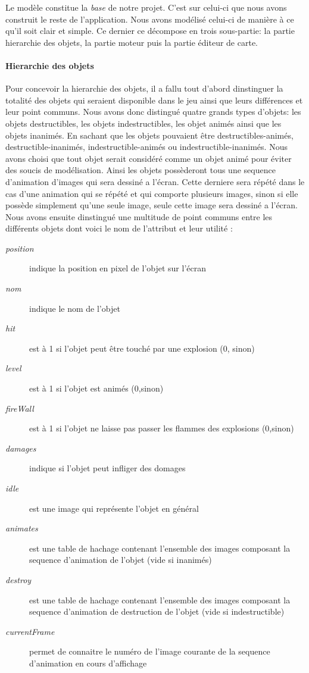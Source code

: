 	Le modèle constitue la \textit{base} de notre projet. C'est sur celui-ci que nous avons construit le reste de l'application. Nous avons modélisé celui-ci de manière à ce qu'il soit clair et simple. Ce dernier ce décompose en trois sous-partie: la partie hierarchie des objets, la partie moteur puis la partie éditeur de carte.\\
	
	\paragraph{Hierarchie des objets \\}
	
	Pour concevoir la hierarchie des objets, il a fallu tout d'abord dinstinguer la totalité des objets qui seraient disponible dans le jeu ainsi que leurs différences et leur point communs.  Nous avons donc distingué quatre grands types d'objets: les objets destructibles, les objets indestructibles, les objet animés ainsi que les objets inanimés. En sachant que les objets pouvaient être destructibles-animés, destructible-inanimés, indestructible-animés ou indestructible-inanimés. Nous avons choisi que tout objet serait considéré comme un objet animé pour éviter des soucis de modélisation. Ainsi les objets possèderont tous une sequence d'animation d'images qui sera dessiné a l'écran. Cette derniere sera répété dans le cas d'une animation qui se répété et qui comporte plusieurs images, sinon si elle possède simplement qu'une seule image, seule cette image sera dessiné a l'écran. Nous avons ensuite dinstingué une multitude de point communs entre les différents objets dont voici le nom de l'attribut et leur utilité : 
	
	\begin{description}
		\item [\textit{position}]{indique la position en pixel de l'objet sur l'écran}
		\item [\textit{nom}]{indique le nom de l'objet}
		\item [\textit{hit}]{est à 1 si l'objet peut être touché par une explosion (0, sinon)}
		\item [\textit{level}]{est à 1 si l'objet est animés (0,sinon)}
		\item [\textit{fireWall}]{est à 1 si l'objet ne laisse pas passer les flammes des explosions (0,sinon)}
		\item [\textit{damages}]{indique si l'objet peut infliger des domages}
		\item [\textit{idle}]{est une image qui représente l'objet en général}
		\item [\textit{animates}]{est une table de hachage contenant l'ensemble des images composant la sequence d'animation de l'objet (vide si inanimés)}
		\item [\textit{destroy}]{est une table de hachage contenant l'ensemble des images composant la sequence d'animation de destruction de l'objet (vide si indestructible)}
		\item [\textit{currentFrame}]{permet de connaitre le numéro de l'image courante de la sequence d'animation en cours d'affichage}
	\end{description}

